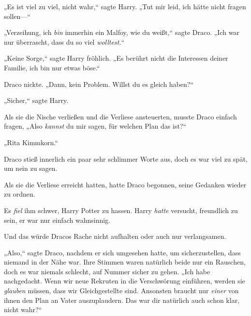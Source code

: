 „Es ist viel zu viel, nicht wahr,“ sagte Harry. „Tut mir leid, ich hätte nicht fragen sollen—“

„Verzeihung, ich \emph{bin} immerhin ein Malfoy, wie du weißt,“ sagte Draco. „Ich war nur überrascht, dass du so viel \emph{wolltest.}“

„Keine Sorge,“ sagte Harry fröhlich. „Es berührt nicht die Interessen deiner Familie, ich bin nur etwas böse.“

Draco nickte. „Dann, kein Problem. Willst du es gleich haben?“

„Sicher,“ sagte Harry.

Als sie die Nische verließen und die Verliese ansteuerten, musste Draco einfach fragen, „Also \emph{kannst} du mir sagen, für welchen Plan das ist?“

„Rita Kimmkorn.“

Draco stieß innerlich ein paar sehr schlimmer Worte aus, doch es war viel zu spät, um nein zu sagen.

\later

Als sie die Verliese erreicht hatten, hatte Draco begonnen, seine Gedanken wieder zu ordnen.

Es \emph{fiel} ihm schwer, Harry Potter zu hassen. Harry \emph{hatte} versucht, freundlich zu sein, er war nur einfach wahnsinnig.

Und das würde Dracos Rache nicht aufhalten oder auch nur verlangsamen.

„Also,“ sagte Draco, nachdem er sich umgesehen hatte, um sicherzustellen, dass niemand in der Nähe war. Ihre Stimmen waren natürlich beide nur ein Rauschen, doch es war niemals schlecht, auf Nummer sicher zu gehen. „Ich habe nachgedacht. Wenn wir neue Rekruten in die Verschwörung einführen, werden sie \emph{glauben} müssen, dass wir Gleichgestellte sind. Ansonsten braucht nur \emph{einer} von ihnen den Plan an Vater auszuplaudern. Das war dir natürlich auch schon klar, nicht wahr?“

